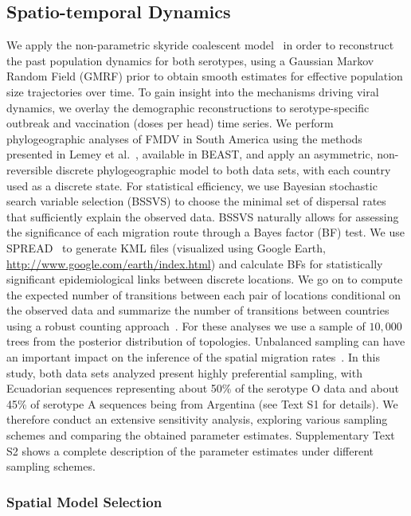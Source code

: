 \documentclass[10pt]{article}
\begin{document}
\subsection*{Spatio-temporal Dynamics}

We apply the non-parametric skyride coalescent model~\cite{skyride} in order to reconstruct the past population dynamics for both serotypes, using a Gaussian Markov Random Field (GMRF) prior to obtain smooth estimates for effective population size trajectories over time.
To gain insight into the mechanisms driving viral dynamics, we overlay the demographic reconstructions to serotype-specific outbreak and vaccination (doses per head) time series.
We perform phylogeographic analyses of FMDV in South America using the methods presented in Lemey et al.~\cite{roots}, available in BEAST, and apply an asymmetric, non-reversible discrete phylogeographic model to both data sets, with each country used as a discrete state.
For statistical efficiency, we use Bayesian stochastic search variable selection (BSSVS) to choose the minimal set of dispersal rates that sufficiently explain the observed data.
BSSVS naturally allows for assessing the significance of each migration route through a Bayes factor (BF) test.
We use SPREAD~\cite{spread} to generate KML files (visualized using Google Earth, \url{http://www.google.com/earth/index.html}) and calculate BFs for statistically significant epidemiological links between discrete locations.
We go on to compute the expected number of transitions between each pair of locations conditional on the observed data and summarize the number of transitions between countries using a robust counting approach~\cite{Minin2008}.
For these analyses we use a sample of $10,000$ trees from the posterior distribution of topologies.
Unbalanced sampling can have an important impact on the inference of the spatial migration rates~\cite{Faria2012, Lemey2014, Frost2014}.
In this study, both data sets analyzed present highly preferential sampling, with Ecuadorian sequences representing about 50\% of the serotype O data and about 45\% of serotype A sequences being from Argentina (see Text S1 for details).
We therefore conduct an extensive sensitivity analysis, exploring various sampling schemes and comparing the obtained parameter estimates.
Supplementary Text S2 shows a complete description of the parameter estimates under different sampling schemes. 

\subsubsection*{Spatial Model Selection}
\end{document}
